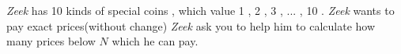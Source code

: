 \textit{Zeek} has 10 kinds of special coins , which value 1 , 2 , 3 , ... , 10 . \textit{Zeek} wants to pay exact prices(without change) \textit{Zeek} ask you to help him to calculate how many prices below $N$ which he can pay. 